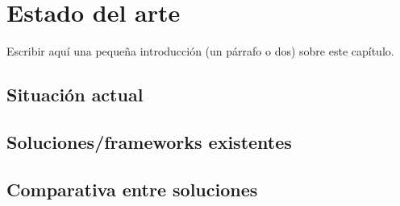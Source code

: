 \chapter{Estado del arte}
\label{chap:02soa}

Escribir aquí una pequeña introducción (un párrafo o dos) sobre este capítulo.

\section{Situación actual}

\section{Soluciones/frameworks existentes}

\section{Comparativa entre soluciones}
